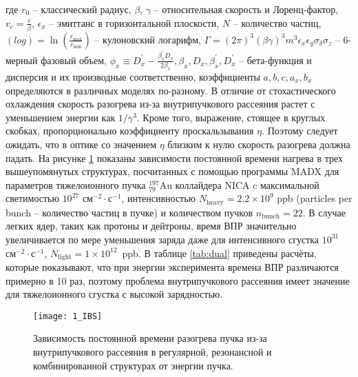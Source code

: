\noindent где $r_0$ -- классический радиус, $\beta$, $\gamma$ -- относительная скорость и Лоренц-фактор, $v_c=\frac{c}{\beta}$,  $\epsilon_x$ -- эмиттанс в горизонтальной плоскости, $N$ -- количество частиц, $\left(log\right)=\ln{\left(\frac{r_{\text{max}}}{r_{\text{min}}}\right)}$ -- кулоновский логарифм, $\Gamma=(2\pi)^3(\beta\gamma)^3m^3\epsilon_x\epsilon_y\sigma_\delta\sigma_z$ -- 6-мерный фазовый объем, $\phi_x\equiv D_x^\prime-\frac{\beta_x^\prime{D}_x}{2\beta_x}, \beta_x,D_x,\beta_x^\prime,D_x^\prime$ -- бета-функция и дисперсия и их производные соответственно,  коэффициенты $a, b, c, a_x,b_x$ определяются в различных моделях по-разному. В отличие от стохастического охлаждения скорость разогрева из-за внутрипучкового рассеяния растет с уменьшением энергии как $1/\gamma^3$. Кроме того, выражение, стоящее в круглых скобках, пропорционально коэффициенту проскальзывания $\eta$. Поэтому следует ожидать, что в оптике со значением $\eta$ близким к нулю скорость разогрева должна падать. На рисунке \ref{fig:1_IBS} показаны зависимости постоянной времени нагрева в трех вышеупомянутых структурах, посчитанных с помощью программы MADX \cite{madx, antoniou:ibs} для параметров тяжелоионного пучка ${_{79}^{197}}\textrm{Au}$ коллайдера NICA c максимальной светимостью ${10}^{27}$ $\text{см}^{-2}\cdot\text{с}^{-1}$, интенсивностью $N_{\text{heavy}} = 2.2\times10^9$ ppb (particles per bunch -- количество частиц в пучке) и количеством пучков $n_{\text{bunch}}=22$. В случае легких ядер, таких как протоны и дейтроны, время ВПР значительно увеличивается по мере уменьшения заряда даже для интенсивного сгустка ${10}^{31}$ $\text{см}^{-2}\cdot\text{с}^{-1}$, $N_{\text{light}} = 1\times10^{12}$~ppb. В таблице \ref{tab:dual} приведены расчёты, которые показывают, что при энергии эксперимента времена ВПР различаются примерно в 10 раз, поэтому проблема внутрипучкового рассеяния имеет значение для тяжелоионного сгустка с высокой зарядностью.

\begin{figure}[!h]
  \centering
   \texttt{[image: 1\_IBS]}
   \caption{Зависимость постоянной времени разогрева пучка из-за внутрипучкового рассеяния в регулярной, резонансной и комбинированной структурах от энергии пучка.}
   \label{fig:1_IBS}
\end{figure}

